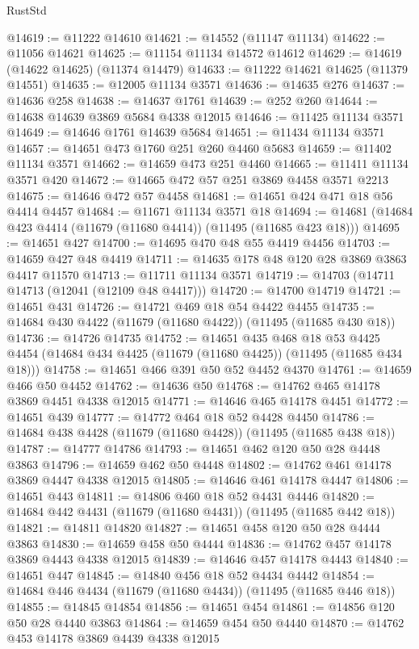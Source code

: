 \begin{lexlean}{RustStd}
\begin{coremodule}
@14619 := @11222 @14610
@14621 := @14552 (@11147 @11134)
@14622 := @11056 @14621
@14625 := @11154 @11134 @14572 @14612
@14629 := @14619 (@14622 @14625) (@11374 @14479)
@14633 := @11222 @14621 @14625 (@11379 @14551)
@14635 := @12005 @11134 @3571
@14636 := @14635 @276
@14637 := @14636 @258
@14638 := @14637 @1761
@14639 := @252 @260
@14644 := @14638 @14639 @3869 @5684 @4338 @12015
@14646 := @11425 @11134 @3571
@14649 := @14646 @1761 @14639 @5684
@14651 := @11434 @11134 @3571
@14657 := @14651 @473 @1760 @251 @260 @4460 @5683
@14659 := @11402 @11134 @3571
@14662 := @14659 @473 @251 @4460
@14665 := @11411 @11134 @3571 @420
@14672 := @14665 @472 @57 @251 @3869 @4458 @3571 @2213
@14675 := @14646 @472 @57 @4458
@14681 := @14651 @424 @471 @18 @56 @4414 @4457
@14684 := @11671 @11134 @3571 @18
@14694 := @14681 (@14684 @423 @4414 (@11679 (@11680 @4414)) (@11495 (@11685 @423 @18)))
@14695 := @14651 @427
@14700 := @14695 @470 @48 @55 @4419 @4456
@14703 := @14659 @427 @48 @4419
@14711 := @14635 @178 @48 @120 @28 @3869 @3863 @4417 @11570
@14713 := @11711 @11134 @3571
@14719 := @14703 (@14711 @14713 (@12041 (@12109 @48 @4417)))
@14720 := @14700 @14719
@14721 := @14651 @431
@14726 := @14721 @469 @18 @54 @4422 @4455
@14735 := @14684 @430 @4422 (@11679 (@11680 @4422)) (@11495 (@11685 @430 @18))
@14736 := @14726 @14735
@14752 := @14651
    @435
    @468
    @18
    @53
    @4425
    @4454
    (@14684 @434 @4425 (@11679 (@11680 @4425)) (@11495 (@11685 @434 @18)))
@14758 := @14651 @466 @391 @50 @52 @4452 @4370
@14761 := @14659 @466 @50 @4452
@14762 := @14636 @50
@14768 := @14762 @465 @14178 @3869 @4451 @4338 @12015
@14771 := @14646 @465 @14178 @4451
@14772 := @14651 @439
@14777 := @14772 @464 @18 @52 @4428 @4450
@14786 := @14684 @438 @4428 (@11679 (@11680 @4428)) (@11495 (@11685 @438 @18))
@14787 := @14777 @14786
@14793 := @14651 @462 @120 @50 @28 @4448 @3863
@14796 := @14659 @462 @50 @4448
@14802 := @14762 @461 @14178 @3869 @4447 @4338 @12015
@14805 := @14646 @461 @14178 @4447
@14806 := @14651 @443
@14811 := @14806 @460 @18 @52 @4431 @4446
@14820 := @14684 @442 @4431 (@11679 (@11680 @4431)) (@11495 (@11685 @442 @18))
@14821 := @14811 @14820
@14827 := @14651 @458 @120 @50 @28 @4444 @3863
@14830 := @14659 @458 @50 @4444
@14836 := @14762 @457 @14178 @3869 @4443 @4338 @12015
@14839 := @14646 @457 @14178 @4443
@14840 := @14651 @447
@14845 := @14840 @456 @18 @52 @4434 @4442
@14854 := @14684 @446 @4434 (@11679 (@11680 @4434)) (@11495 (@11685 @446 @18))
@14855 := @14845 @14854
@14856 := @14651 @454
@14861 := @14856 @120 @50 @28 @4440 @3863
@14864 := @14659 @454 @50 @4440
@14870 := @14762 @453 @14178 @3869 @4439 @4338 @12015

\end{coremodule}
\end{lexlean}
